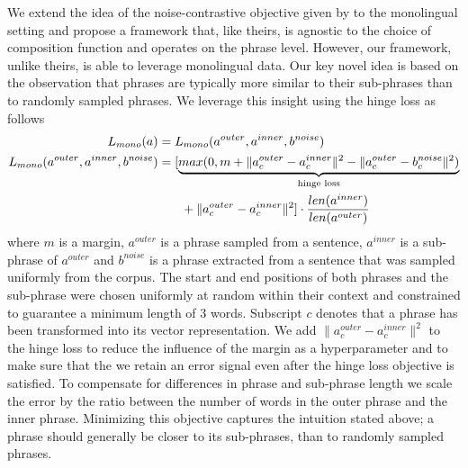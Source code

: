 \documentclass{article} \usepackage{iclr2015,times}
\begin{document}
We extend the idea of the noise-contrastive objective given by
\citet{hermann2014multilingual} to the monolingual setting
and propose a framework that, like theirs, is agnostic to the choice of
composition function and operates on the phrase level.
However, our framework, unlike theirs, is able to leverage monolingual data.
Our key novel idea is based on the observation that phrases are typically more
similar to their sub-phrases than to randomly sampled phrases.
We leverage this insight using the hinge loss as follows
\begin{align}
    L_{mono}(a) &= L_{mono}(a^{outer}, a^{inner}, b^{noise}) \\
    L_{mono}(a^{outer},a^{inner},b^{noise}) &=
    [\underbrace{max(0, m + \| a^{outer}_{c} - a^{inner}_{c} \|^2 - \| a^{outer}_{c} - b^{noise}_{c} \|^2)}_{\text{hinge loss}} \\
    &\phantom{{}=1} + \| a^{outer}_{c} - a^{inner}_{c} \|^2] \cdot \frac{len(a^{inner})}{len(a^{outer})} \notag
\end{align}
where $m$ is a margin, $a^{outer}$ is a phrase sampled from a sentence,
$a^{inner}$ is a sub-phrase of $a^{outer}$ and $b^{noise}$ is
a phrase extracted from a sentence that was sampled uniformly from
the corpus. 
The start and end positions of both phrases and 
the sub-phrase were chosen uniformly at random within their context and 
constrained to guarantee a minimum length of 3 words.
Subscript $c$ denotes that a phrase has been transformed
into its vector representation.
We add $\| a^{outer}_{c} - a^{inner}_{c} \|^2$ to the hinge loss to reduce the
influence of the margin as a hyperparameter and to make sure that the
we retain an error signal even after the hinge loss objective is satisfied.
To compensate for differences in phrase and sub-phrase length we scale the
error by the ratio between the number of words in the outer phrase and the
inner phrase.
Minimizing this objective captures the intuition stated above; a phrase
should generally be closer to its sub-phrases,
than to randomly sampled phrases.
\end{document}

